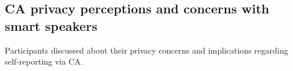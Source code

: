         
        
           

        
    
    
\subsection{\ac{CA} privacy perceptions and concerns with smart speakers}
    Participants discussed about their privacy concerns and implications regarding self-reporting via \ac{CA}.

